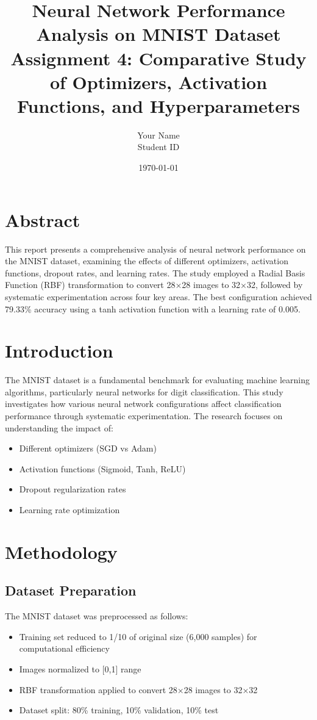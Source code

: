\documentclass[11pt,a4paper]{article}
\title{\textbf{Neural Network Performance Analysis on MNIST Dataset \\
\large Assignment 4: Comparative Study of Optimizers, Activation Functions, and Hyperparameters}}
\author{Your Name \\ Student ID}
\date{\today}
\begin{document}
\maketitle

\section{Abstract}
This report presents a comprehensive analysis of neural network performance on the MNIST dataset, examining the effects of different optimizers, activation functions, dropout rates, and learning rates. The study employed a Radial Basis Function (RBF) transformation to convert 28×28 images to 32×32, followed by systematic experimentation across four key areas. The best configuration achieved 79.33\% accuracy using a tanh activation function with a learning rate of 0.005.

\section{Introduction}
The MNIST dataset is a fundamental benchmark for evaluating machine learning algorithms, particularly neural networks for digit classification. This study investigates how various neural network configurations affect classification performance through systematic experimentation. The research focuses on understanding the impact of:
\begin{itemize}
    \item Different optimizers (SGD vs Adam)
    \item Activation functions (Sigmoid, Tanh, ReLU)
    \item Dropout regularization rates
    \item Learning rate optimization
\end{itemize}

\section{Methodology}

\subsection{Dataset Preparation}
The MNIST dataset was preprocessed as follows:
\begin{itemize}
    \item Training set reduced to 1/10 of original size (6,000 samples) for computational efficiency
    \item Images normalized to [0,1] range
    \item RBF transformation applied to convert 28×28 images to 32×32
    \item Dataset split: 80\% training, 10\% validation, 10\% test
\end{itemize}
\end{document}

